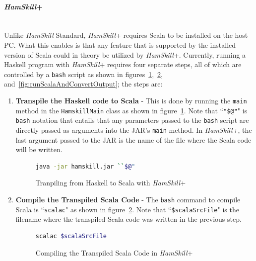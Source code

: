 \documentclass{report}
\newcommand{\myparagraph}[1]{\paragraph{#1}\mbox{}\\}
\begin{document}
\myparagraph{\textit{HamSkill}+}

Unlike \textit{HamSkill} Standard, \textit{HamSkill}+ requires Scala to be installed on the host PC.  What this enables is that any feature that is supported by the installed version of Scala could in theory be utilized by \textit{HamSkill}+.  Currently, running a Haskell program with \textit{HamSkill}+ requires four separate steps, all of which are controlled by a \texttt{bash} script as shown in figures~\ref{fig:runHamSkill},~\ref{fig:compileScala}, and~\ref{fig:runScalaAndConvertOutput}; the steps are:

\begin{enumerate}

\item \textbf{Transpile the Haskell code to Scala} - This is done by running the \texttt{main} method in the \texttt{HamskillMain} class as shown in figure~\ref{fig:runHamSkill}.  Note that ``\texttt{"\$@"}" is \texttt{bash} notation that entails that any parameters passed to the \texttt{bash} script are directly passed as arguments into the JAR's \texttt{main} method.  In \textit{HamSkill+}, the last argument passed to the JAR is the name of the file where the Scala code will be written.

\begin{figure}[H]
\begin{mdframed}
\begin{lstlisting}[language=bash]
java -jar hamskill.jar ``$@"
\end{lstlisting}
\end{mdframed}
\caption{Tranpiling from Haskell to Scala with \textit{HamSkill}+}\label{fig:runHamSkill}
\end{figure}

\item \textbf{Compile the Transpiled Scala Code} - The \texttt{bash} command to compile Scala is ``\texttt{scalac}" as shown in figure~\ref{fig:compileScala}.  Note that ``\texttt{\$scalaSrcFile}" is the filename where the transpiled Scala code was written in the previous step.

\begin{figure}[H]
\begin{mdframed}
\begin{lstlisting}[language=bash]
scalac $scalaSrcFile
\end{lstlisting}
\end{mdframed}
\caption{Compiling the Transpiled Scala Code in \textit{HamSkill}+}\label{fig:compileScala}
\end{figure}


\end{enumerate}
\end{document}
